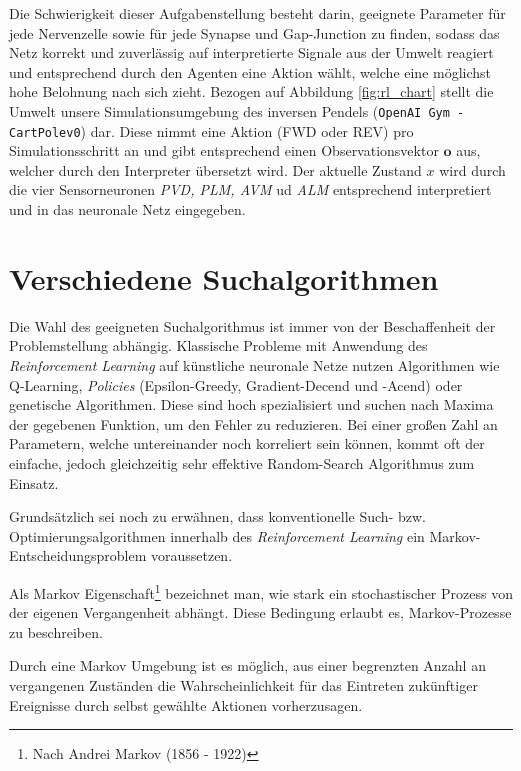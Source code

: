 	Die Schwierigkeit dieser Aufgabenstellung besteht darin, geeignete Parameter für jede Nervenzelle sowie für jede Synapse und Gap-Junction zu finden, sodass das Netz korrekt und zuverlässig auf interpretierte Signale aus der Umwelt reagiert und entsprechend durch den Agenten eine Aktion wählt, welche eine möglichst hohe Belohnung nach sich zieht. Bezogen auf Abbildung \ref{fig:rl_chart} stellt die Umwelt unsere Simulationsumgebung des inversen Pendels (\texttt{OpenAI Gym - CartPolev0}) dar. Diese nimmt eine Aktion (FWD oder REV) pro Simulationsschritt an und gibt entsprechend einen Observationsvektor $\textbf{o}$ aus, welcher durch den Interpreter übersetzt wird. Der aktuelle Zustand $x$ wird durch die vier Sensorneuronen \textit{PVD, PLM, AVM} ud \textit{ALM} entsprechend interpretiert und in das neuronale Netz eingegeben.

\section{Verschiedene Suchalgorithmen}
\label{sec:rl_alt}
	Die Wahl des geeigneten Suchalgorithmus ist immer von der Beschaffenheit der Problemstellung abhängig. Klassische Probleme mit Anwendung des \textit{Reinforcement Learning} auf künstliche neuronale Netze nutzen Algorithmen wie Q-Learning, \textit{Policies} (Epsilon-Greedy, Gradient-Decend und -Acend) oder genetische Algorithmen. Diese sind hoch spezialisiert und suchen nach Maxima der gegebenen Funktion, um den Fehler zu reduzieren. Bei einer großen Zahl an Parametern, welche untereinander noch korreliert sein können, kommt oft der einfache, jedoch gleichzeitig sehr effektive \glqq Random-Search\grqq{} Algorithmus zum Einsatz.
	
	Grundsätzlich sei noch zu erwähnen, dass konventionelle Such- bzw. Optimierungsalgorithmen innerhalb des \textit{Reinforcement Learning} ein Markov-Entscheidungsproblem voraussetzen. 
	\begin{remark}
		Als Markov Eigenschaft\footnote{Nach Andrei Markov (1856 - 1922)} bezeichnet man, wie stark ein stochastischer Prozess von der eigenen Vergangenheit abhängt. Diese Bedingung erlaubt es, Markov-Prozesse zu beschreiben.
		
		Durch eine Markov Umgebung ist es möglich, aus einer begrenzten Anzahl an vergangenen Zuständen die Wahrscheinlichkeit für das Eintreten zukünftiger Ereignisse durch selbst gewählte Aktionen vorherzusagen. \cite{SilverRL}
	\end{remark}
	
